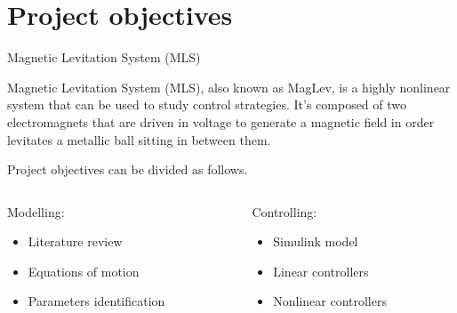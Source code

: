 \section{Project objectives}

\begin{frame}{Magnetic Levitation System (MLS)}

    Magnetic Levitation System (MLS), also known as MagLev, is a highly nonlinear system that can be used to study control strategies.
    It's composed of two electromagnets that are driven in voltage to generate a magnetic field in order levitates a metallic ball sitting in between them.

    \vspace{9pt}

    Project objectives can be divided as follows.

    \begin{columns}[c, onlytextwidth]

        \begin{column}{0.5\textwidth}

            Modelling:

            \begin{itemize}
                \item Literature review
                \item Equations of motion
                \item Parameters identification
            \end{itemize}

        \end{column}

        \begin{column}{0.5\textwidth}

            Controlling:

            \begin{itemize}
                \item Simulink model
                \item Linear controllers
                \item Nonlinear controllers
            \end{itemize}

        \end{column}

    \end{columns}

\end{frame}